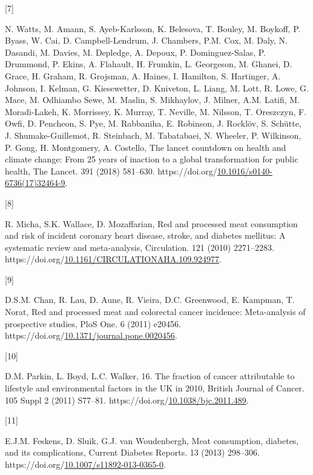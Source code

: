 \documentclass[preprint,3p,
a4paper]{elsarticle} %
\newlength{\cslhangindent}
\newlength{\csllabelwidth}
\newlength{\cslentryspacingunit} %
\newenvironment{CSLReferences}[2] %
 {%
  \setlength{\parindent}{0pt}
  \ifodd #1
  \let\oldpar\par
  \def\par{\hangindent=\cslhangindent\oldpar}
  \fi
  \setlength{\parskip}{#2\cslentryspacingunit}
 }%
 {}
\newcommand{\CSLLeftMargin}[1]{\parbox[t]{\csllabelwidth}{#1}}
\newcommand{\CSLRightInline}[1]{\parbox[t]{\linewidth - \csllabelwidth}{#1}\break}
\begin{document}
\begin{CSLReferences}{0}{0}
\leavevmode{}%
\CSLLeftMargin{{[}7{]} }%
\CSLRightInline{N. Watts, M. Amann, S. Ayeb-Karlsson, K. Belesova, T.
Bouley, M. Boykoff, P. Byass, W. Cai, D. Campbell-Lendrum, J. Chambers,
P.M. Cox, M. Daly, N. Dasandi, M. Davies, M. Depledge, A. Depoux, P.
Dominguez-Salas, P. Drummond, P. Ekins, A. Flahault, H. Frumkin, L.
Georgeson, M. Ghanei, D. Grace, H. Graham, R. Grojsman, A. Haines, I.
Hamilton, S. Hartinger, A. Johnson, I. Kelman, G. Kiesewetter, D.
Kniveton, L. Liang, M. Lott, R. Lowe, G. Mace, M. Odhiambo Sewe, M.
Maslin, S. Mikhaylov, J. Milner, A.M. Latifi, M. Moradi-Lakeh, K.
Morrissey, K. Murray, T. Neville, M. Nilsson, T. Oreszczyn, F. Owfi, D.
Pencheon, S. Pye, M. Rabbaniha, E. Robinson, J. Rocklöv, S. Schütte, J.
Shumake-Guillemot, R. Steinbach, M. Tabatabaei, N. Wheeler, P.
Wilkinson, P. Gong, H. Montgomery, A. Costello, The lancet countdown on
health and climate change: From 25 years of inaction to a global
transformation for public health, The Lancet. 391 (2018) 581--630.
https://doi.org/\href{https://doi.org/10.1016/s0140-6736(17)32464-9}{10.1016/s0140-6736(17)32464-9}.}

\leavevmode{}%
\CSLLeftMargin{{[}8{]} }%
\CSLRightInline{R. Micha, S.K. Wallace, D. Mozaffarian, Red and
processed meat consumption and risk of incident coronary heart disease,
stroke, and diabetes mellitus: A systematic review and meta-analysis,
Circulation. 121 (2010) 2271--2283.
https://doi.org/\href{https://doi.org/10.1161/CIRCULATIONAHA.109.924977}{10.1161/CIRCULATIONAHA.109.924977}.}

\leavevmode{}%
\CSLLeftMargin{{[}9{]} }%
\CSLRightInline{D.S.M. Chan, R. Lau, D. Aune, R. Vieira, D.C. Greenwood,
E. Kampman, T. Norat, Red and processed meat and colorectal cancer
incidence: Meta-analysis of prospective studies, PloS One. 6 (2011)
e20456.
https://doi.org/\href{https://doi.org/10.1371/journal.pone.0020456}{10.1371/journal.pone.0020456}.}

\leavevmode{}%
\CSLLeftMargin{{[}10{]} }%
\CSLRightInline{D.M. Parkin, L. Boyd, L.C. Walker, 16. The fraction of
cancer attributable to lifestyle and environmental factors in the UK in
2010, British Journal of Cancer. 105 Suppl 2 (2011) S77--81.
https://doi.org/\href{https://doi.org/10.1038/bjc.2011.489}{10.1038/bjc.2011.489}.}

\leavevmode{}%
\CSLLeftMargin{{[}11{]} }%
\CSLRightInline{E.J.M. Feskens, D. Sluik, G.J. van Woudenbergh, Meat
consumption, diabetes, and its complications, Current Diabetes Reports.
13 (2013) 298--306.
https://doi.org/\href{https://doi.org/10.1007/s11892-013-0365-0}{10.1007/s11892-013-0365-0}.}


\end{CSLReferences}
\end{document}
